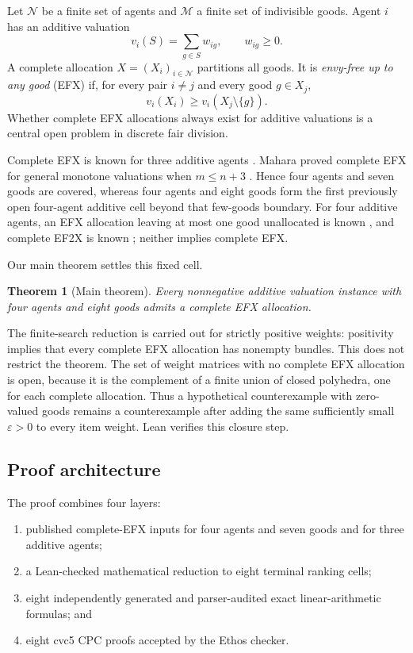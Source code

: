 \documentclass[11pt]{article}
\newtheorem{theorem}{Theorem}[section]
\theoremstyle{definition}
\newcommand{\N}{\mathcal{N}}
\newcommand{\M}{\mathcal{M}}
\begin{document}
Let $\N$ be a finite set of agents and $\M$ a finite set of indivisible
goods. Agent $i$ has an additive valuation
\[
  v_i(S)=\sum_{g\in S}w_{ig},\qquad w_{ig}\ge0.
\]
A complete allocation $X=(X_i)_{i\in\N}$ partitions all goods. It is
\emph{envy-free up to any good} (EFX) if, for every pair $i\ne j$ and every
good $g\in X_j$,
\[
  v_i(X_i)\ge v_i(X_j\setminus\{g\}).
\]
Whether complete EFX allocations always exist for additive valuations is a
central open problem in discrete fair division.

Complete EFX is known for three additive agents \cite{CGM2024}. Mahara proved
complete EFX for general monotone valuations when $m\le n+3$
\cite{Mahara2021}. Hence four agents and seven goods are covered, whereas
four agents and eight goods form the first previously open four-agent
additive cell beyond that few-goods boundary. For four additive agents, an EFX
allocation leaving at most one good unallocated is known
\cite{Berger2022}, and complete EF2X is known \cite{Ashuri2025}; neither
implies complete EFX.

Our main theorem settles this fixed cell.

\begin{theorem}[Main theorem]\label{thm:main}
Every nonnegative additive valuation instance with four agents and eight
goods admits a complete EFX allocation.
\end{theorem}

The finite-search reduction is carried out for strictly positive weights:
positivity implies that every complete EFX allocation has nonempty bundles.
This does not restrict the theorem. The set of weight matrices with no
complete EFX allocation is open, because it is the complement of a finite
union of closed polyhedra, one for each complete allocation. Thus a
hypothetical counterexample with zero-valued goods remains a counterexample
after adding the same sufficiently small $\varepsilon>0$ to every item
weight. Lean verifies this closure step.

\subsection{Proof architecture}

The proof combines four layers:
\begin{enumerate}[leftmargin=2.1em]
  \item published complete-EFX inputs for four agents and seven goods and for
  three additive agents;
  \item a Lean-checked mathematical reduction to eight terminal ranking
  cells;
  \item eight independently generated and parser-audited exact
  linear-arithmetic formulas; and
  \item eight cvc5 CPC proofs accepted by the Ethos checker.
\end{enumerate}
\end{document}
